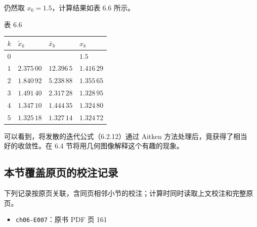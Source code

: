 \documentclass[
  10pt,
  fontset=fandol]{ctexart}
\newcounter{none} %
\providecommand{\tightlist}{%
  \setlength{\itemsep}{0pt}\setlength{\parskip}{0pt}}
\begin{document}
仍然取 \(x_0=1.5\)，计算结果如表 6.6 所示。

表 6.6

{\def\LTcaptype{none} %
\begin{longtable}[]{@{}llll@{}}
\toprule\noalign{}
\(k\) & \(\tilde{x}_k\) & \(\bar{x}_k\) & \(x_k\) \\
\midrule\noalign{}
\endhead
\bottomrule\noalign{}
\endlastfoot
\(0\) & & & \(1.5\) \\
\(1\) & \(2.375\,00\) & \(12.396\,5\) & \(1.416\,29\) \\
\(2\) & \(1.840\,92\) & \(5.238\,88\) & \(1.355\,65\) \\
\(3\) & \(1.491\,40\) & \(2.317\,28\) & \(1.328\,95\) \\
\(4\) & \(1.347\,10\) & \(1.444\,35\) & \(1.324\,80\) \\
\(5\) & \(1.325\,18\) & \(1.327\,14\) & \(1.324\,72\) \\
\end{longtable}
}

可以看到，将发散的迭代公式（6.2.12）通过 Aitken 方法处理后，竟获得了相当好的收敛性。在 6.4 节将用几何图像解释这个有趣的现象。

\subsection{本节覆盖原页的校注记录}\label{ux672cux8282ux8986ux76d6ux539fux9875ux7684ux6821ux6ce8ux8bb0ux5f55}

下列记录按原页关联，含同页相邻小节的校注；计算时同时读取上文校注和完整原页。

\begin{itemize}
\tightlist
\item
  \texttt{ch06-E007}：原书 PDF 页 161
\end{itemize}
\end{document}
